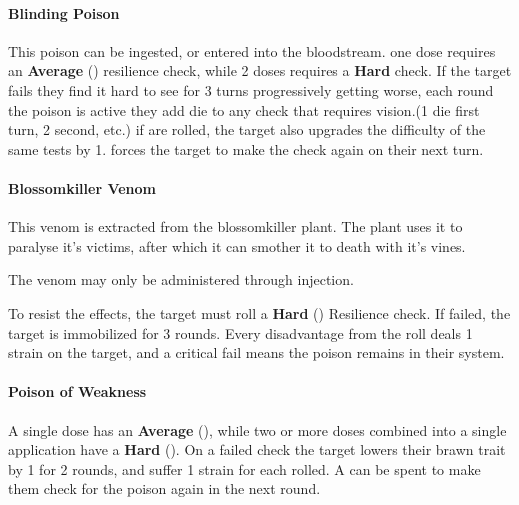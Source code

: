 \begin{multicols}{2}
\paragraph{Blinding Poison} \label{poison:blinding}
This poison can be ingested, or entered into the bloodstream.
one dose requires an \textbf{Average} (\difficulty\difficulty\difficulty)
resilience check, while 2 doses requires a \textbf{Hard} check. If the target
fails they find it hard to see for 3 turns progressively getting worse,
each round the poison is active they add \setback die to any check
that requires vision.(1 die first turn, 2 second, etc.) if \threat\threat\threat
are rolled, the target also upgrades the difficulty of the same tests
by 1. \despair forces the target to make the check again on their next turn.

\paragraph{Blossomkiller Venom} \label{poison:blossomkiller}
This venom is extracted from the blossomkiller plant. The plant uses
it to paralyse it's victims, after which it can smother it to death
with it's vines.

The venom may only be administered through injection.

To resist the effects, the target must roll a \textbf{Hard} (\difficulty\difficulty\difficulty)
Resilience check. If failed, the target is immobilized for 3
rounds. Every disadvantage from the roll deals 1 strain on the
target, and a critical fail means the poison remains in their
system.

%
%


\paragraph{Poison of Weakness} \label{poison:weakness}
A single dose has an \textbf{Average} (\difficulty\difficulty), while two or more
doses combined into a single application have a
\textbf{Hard} (\difficulty\difficulty\difficulty). On a failed check the
target lowers their brawn trait by 1 for 2 rounds, and suffer 1 strain
for each \threat rolled. A \despair can be spent to make them check for
the poison again in the next round.


\end{multicols}
